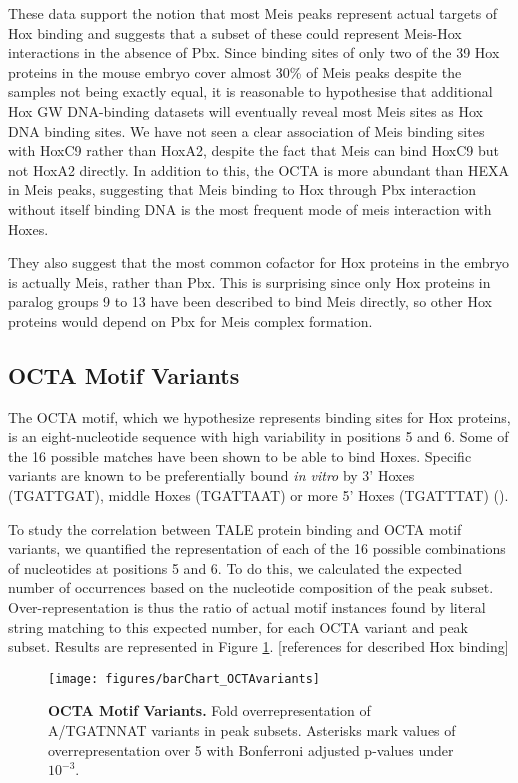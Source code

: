 These data support the notion that most Meis peaks represent actual targets of Hox binding and suggests that a subset of these could represent Meis-Hox interactions in the absence of Pbx. Since binding sites of only two of the 39 Hox proteins in the mouse embryo cover almost 30\% of Meis peaks despite the samples not being exactly equal, it is reasonable to hypothesise that additional Hox \ac{GW} DNA-binding datasets will eventually reveal most Meis sites as Hox DNA binding sites. We have not seen a clear association of Meis binding sites with HoxC9 rather than HoxA2, despite the fact that Meis can bind HoxC9 but not HoxA2 directly. In addition to this, the \ac{OCTA} is more abundant than \ac{HEXA} in Meis peaks, suggesting that Meis binding to Hox through Pbx interaction without itself binding DNA is the most frequent mode of meis interaction with Hoxes.

They also suggest that the most common cofactor for Hox proteins in the embryo is actually Meis, rather than Pbx. This is surprising since only Hox proteins in paralog groups 9 to 13 have been described to bind Meis directly, so other Hox proteins would depend on Pbx for Meis complex formation. 

\subsection{OCTA Motif Variants}

The \ac{OCTA} motif, which we hypothesize represents binding sites for Hox proteins, is an eight-nucleotide sequence with high variability in positions 5 and 6. Some of the 16 possible matches have been shown to be able to bind Hoxes. Specific variants are known to be preferentially bound \textit{in vitro} by 3' Hoxes (TGATTGAT), middle Hoxes (TGATTAAT) or more 5' Hoxes (TGATTTAT) (\cite{Shen1997a,Slattery2011}).

To study the correlation between \ac{TALE} protein binding and \ac{OCTA} motif variants, we quantified the representation of each of the 16 possible combinations of nucleotides at positions 5 and 6. To do this, we calculated the expected number of occurrences based on the nucleotide composition of the peak subset. Over-representation is thus the ratio of actual motif instances found by literal string matching to this expected number, for each \ac{OCTA} variant and peak subset. Results are represented in Figure \ref{fig:OCTAvariants}. [references for described Hox binding] 

\begin{figure}[]
  
  \centering
  \texttt{[image: figures/barChart\_OCTAvariants]}
  \caption[OCTA Motif Variants]{\textbf{OCTA Motif Variants.} Fold overrepresentation of A/TGATNNAT variants in peak subsets. Asterisks mark values of overrepresentation over 5 with Bonferroni adjusted p-values under $10^{-3}$.}
  \label{fig:OCTAvariants}
\end{figure}

